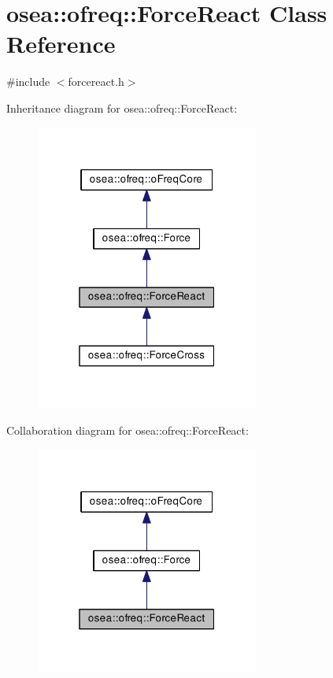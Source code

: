 \hypertarget{classosea_1_1ofreq_1_1_force_react}{\section{osea\-:\-:ofreq\-:\-:Force\-React Class Reference}
\label{classosea_1_1ofreq_1_1_force_react}
}


{\ttfamily \#include $<$forcereact.\-h$>$}



Inheritance diagram for osea\-:\-:ofreq\-:\-:Force\-React\-:\nopagebreak
\begin{figure}[H]
\begin{center}
\leavevmode
\includegraphics[width=208pt]{classosea_1_1ofreq_1_1_force_react__inherit__graph}
\end{center}
\end{figure}


Collaboration diagram for osea\-:\-:ofreq\-:\-:Force\-React\-:\nopagebreak
\begin{figure}[H]
\begin{center}
\leavevmode
\includegraphics[width=208pt]{classosea_1_1ofreq_1_1_force_react__coll__graph}
\end{center}
\end{figure}
